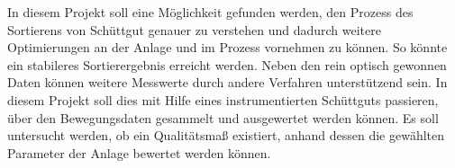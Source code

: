 In diesem Projekt soll eine Möglichkeit gefunden werden, den Prozess des Sortierens von Schüttgut genauer zu verstehen und dadurch weitere Optimierungen an der Anlage und im Prozess vornehmen zu können. So könnte ein stabileres Sortierergebnis erreicht werden. Neben den rein optisch gewonnen Daten können weitere Messwerte durch andere Verfahren unterstützend sein. In diesem Projekt soll dies mit Hilfe eines instrumentierten Schüttguts passieren, über den Bewegungsdaten gesammelt und ausgewertet werden können. Es soll untersucht werden, ob ein Qualitätsmaß existiert, anhand dessen die gewählten Parameter der Anlage bewertet werden können.

%
